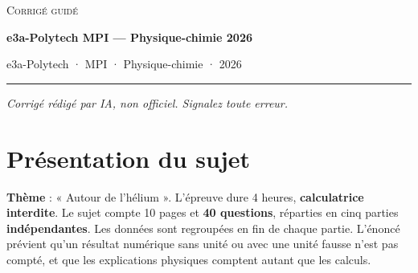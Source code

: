\documentclass[11pt,a4paper]{article}
\begin{document}
\thispagestyle{plain}
\begin{center}
  {\small\scshape Corrigé guidé}\par\smallskip
  {\LARGE\bfseries e3a-Polytech MPI — Physique-chimie 2026\par}\medskip
  {\large e3a-Polytech · MPI · Physique-chimie · 2026\par}
\end{center}
\vspace{2pt}\hrule\vspace{8pt}

\emph{Corrigé rédigé par IA, non officiel. Signalez toute erreur.}

\hypertarget{pruxe9sentation-du-sujet}{%
\section{Présentation du sujet}\label{pruxe9sentation-du-sujet}}

\textbf{Thème} : « Autour de l'hélium ». L'épreuve dure 4 heures, \textbf{calculatrice interdite}. Le sujet compte 10 pages et \textbf{40 questions}, réparties en cinq parties \textbf{indépendantes}. Les données sont regroupées en fin de chaque partie. L'énoncé prévient qu'un résultat numérique sans unité ou avec une unité fausse n'est pas compté, et que les explications physiques comptent autant que les calculs.
\end{document}
